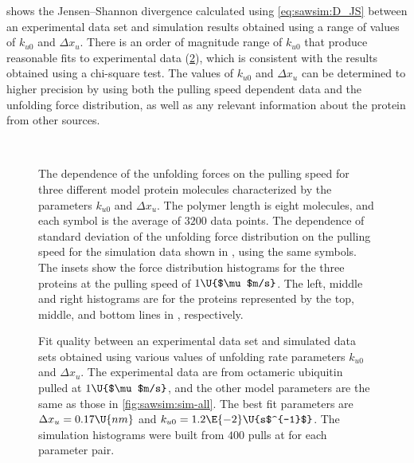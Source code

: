  shows the Jensen--Shannon divergence
calculated using \cref{eq:sawsim:D_JS} between an experimental data
set and simulation results obtained using a range of values of
$k_{u0}$ and $\Delta x_u$.  There is an order of magnitude range of
$k_{u0}$ that produce reasonable fits to experimental data
(\cref{fig:sawsim:fit-space}), which is consistent with the results
\citet{best02} obtained using a chi-square test.  The values of
$k_{u0}$ and $\Delta x_u$ can be determined to higher precision by
using both the pulling speed dependent data and the unfolding force
distribution, as well as any relevant information about the protein
from other sources.

\begin{figure}
  \begin{center}
   \\
  \caption{\protect{} The dependence of the
    unfolding forces on the pulling speed for three different model
    protein molecules characterized by the parameters $k_{u0}$ and
    $\Delta x_u$.  The polymer length is eight molecules, and each
    symbol is the average of $3200$ data points.
    \protect{} The dependence of standard
    deviation of the unfolding force distribution on the pulling speed
    for the simulation data shown in
    \protect{}, using the same symbols.  The
    insets show the force distribution histograms for the three
    proteins at the pulling speed of $1\U{$\mu$m/s}$.  The left,
    middle and right histograms are for the proteins represented by
    the top, middle, and bottom lines in
    \protect{},
    respectively.\label{fig:sawsim:all-v-dep}}
  \end{center}
\end{figure}

\begin{figure}
  \begin{center}
  \caption{Fit quality between an experimental data set and simulated
    data sets obtained using various values of unfolding rate
    parameters $k_{u0}$ and $\Delta x_u$.  The experimental data are
    from octameric ubiquitin pulled at $1\U{$\mu$m/s}$\citep{chyan04},
    and the other model parameters are the same as those in
    \cref{fig:sawsim:sim-all}.  The best fit parameters are $\Delta
    x_u=0.17\U{nm}$ and $k_{u0}=1.2\E{-2}\U{s$^{-1}$}$.  The
    simulation histograms were built from $400$ pulls at for each
    parameter pair.\label{fig:sawsim:fit-space}}
  \end{center}
\end{figure}

